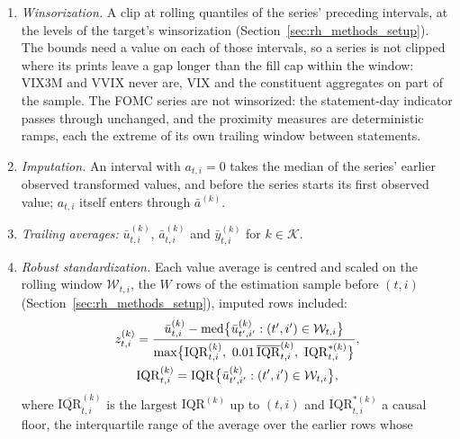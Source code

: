 \begin{itemize}
\begin{enumerate}
    turnover and the effective spread, signed power roots for the higher moments and the autocovariance, the identity
    for the other signed series and absolute returns, and the logarithm otherwise. The volatility-demand series,
    whose standard-deviation divisor sits at its floor, take instead an inverse hyperbolic sine of the raw series,
    scaled by a trailing average of its absolute value.
  \item \emph{Winsorization.} A clip at rolling quantiles of the series' preceding \rhdmWinsorWindow{} intervals, at the
    levels of the target's winsorization (Section~\ref{sec:rh_methods_setup}). The bounds need a value on each of
    those intervals, so a series is not clipped where its prints leave a gap longer than the fill cap within the
    window: VIX3M and VVIX never are, VIX and the constituent aggregates on part of the sample. The FOMC series are
    not winsorized: the statement-day indicator passes through unchanged, and the proximity measures are
    deterministic ramps, each the extreme of its own trailing window between statements.
  \item \emph{Imputation.} An interval with $a_{t,i} = 0$ takes the median of the series' earlier observed
    transformed values, and before the series starts its first observed value; $a_{t,i}$ itself enters through
    $\bar a^{(k)}$.
  \item \emph{Trailing averages:} $\bar u^{(k)}_{t,i}$, $\bar a^{(k)}_{t,i}$ and $\bar y^{(k)}_{t,i}$ for
    $k \in \mathcal{K}$.
  \item \emph{Robust standardization.} Each value average is centred and scaled on the rolling window
    $\mathcal{W}_{t,i}$, the $W$ rows of the estimation sample before $(t,i)$ (Section~\ref{sec:rh_methods_setup}),
    imputed rows included:
    \begin{gather*}
      z^{(k)}_{t,i} = \frac{\bar u^{(k)}_{t,i}
          - \operatorname{med}\bigl\{\bar u^{(k)}_{t',i'} : (t',i') \in \mathcal{W}_{t,i}\bigr\}}
        {\max\bigl\{\mathrm{IQR}^{(k)}_{t,i},\ \rhdmIqrFloorFrac\,\overline{\mathrm{IQR}}^{(k)}_{t,i},\
          \mathrm{IQR}^{\ast(k)}_{t,i}\bigr\}}, \\
      \mathrm{IQR}^{(k)}_{t,i} = \mathrm{IQR}\bigl\{\bar u^{(k)}_{t',i'} : (t',i') \in \mathcal{W}_{t,i}\bigr\},
    \end{gather*}
    where $\overline{\mathrm{IQR}}^{(k)}_{t,i}$ is the largest $\mathrm{IQR}^{(k)}$ up to $(t,i)$ and
    $\mathrm{IQR}^{\ast(k)}_{t,i}$ a causal floor, the interquartile range of the average over the earlier rows whose

\end{enumerate}
\end{itemize}
